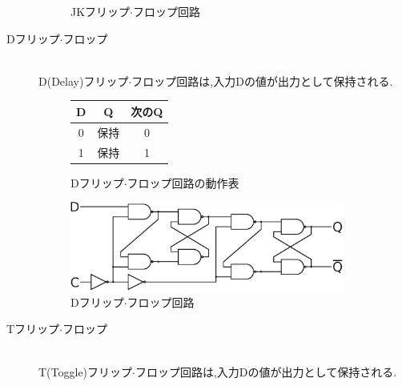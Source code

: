 \documentclass[uplatex]{jsarticle}
\makeatletter
\newcommand{\tblcaption}[1]{\def\@captype{table}\caption{#1}}
\makeatother
\begin{document}
\begin{description}
\begin{figure}[h]
\begin{minipage}[c]{.6\textwidth}
                    \caption{JKフリップ$\cdot$フロップ回路}
                  \end{minipage}
                \end{figure}
            \item[Dフリップ$\cdot$フロップ]\mbox{}\\
                D(Delay)フリップ$\cdot$フロップ回路は,入力Dの値が出力として保持される.
                \begin{figure}[h]
                    \def\@captype{table}
                    \begin{minipage}{.4\textwidth}
                        \begin{center}
                            \begin{tabular}{c|c|c}\hline
                                D & Q    & 次のQ \\ \hline
                                0 & 保持 & 0 \\ \hline
                                1 & 保持 & 1 \\ \hline
                            \end{tabular}
                        \end{center}
                        \tblcaption{Dフリップ$\cdot$フロップ回路の動作表}
                    \end{minipage}
                    \hfill
                    \begin{minipage}[c]{.6\textwidth}
                        \includegraphics[width = 9.0cm]{D.eps}
                    \caption{Dフリップ$\cdot$フロップ回路}
                  \end{minipage}
                \end{figure}
            \newpage
            \item[Tフリップ$\cdot$フロップ]\mbox{}\\
                T(Toggle)フリップ$\cdot$フロップ回路は,入力Dの値が出力として保持される.
                \begin{figure}[h]
                    \def\@captype{table}
                    \begin{minipage}{.4\textwidth}
                        \begin{center}

\end{center}
\end{minipage}
\end{figure}
\end{description}
\end{document}

